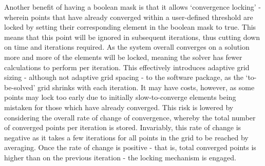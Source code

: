 			Another benefit of having a boolean mask is that it allows `convergence locking' - wherein points that have already converged within a user-defined threshold are locked by setting their corresponding element in the boolean mask to true. This means that this point will be ignored in subsequent iterations, thus cutting down on time and iterations required. As the system overall converges on a solution more and more of the elements will be locked, meaning the solver has fewer calculations to perform per iteration. This effectively introduces adaptive grid sizing - although not adaptive grid spacing - to the software package, as the `to-be-solved' grid shrinks with each iteration. It may have costs, however, as some points may lock too early due to initially slow-to-converge elements being mistaken for those which have already converged. This risk is lowered by considering the overall rate of change of convergence, whereby the total number of converged points per iteration is stored. Invariably, this rate of change is negative as it takes a few iterations for all points in the grid to be reached by averaging. Once the rate of change is positive - that is, total converged points is higher than on the previous iteration - the locking mechanism is engaged.
